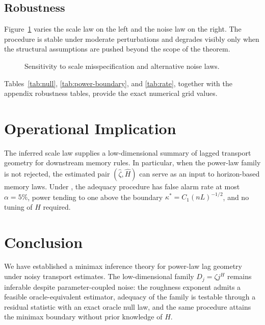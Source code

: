 \documentclass[10pt,a4paper,twocolumn]{article}
\begin{document}
\subsection{Robustness}

Figure~\ref{fig:robustness} varies the scale law on the left and the noise law
on the right.  The procedure is stable under moderate perturbations and
degrades visibly only when the structural assumptions are pushed beyond the
scope of the theorem.

\begin{figure}[t]
\centering
{}
\caption{Sensitivity to scale misspecification and alternative noise laws.}
\label{fig:robustness}
\end{figure}

Tables~\ref{tab:null}, \ref{tab:power-boundary}, and \ref{tab:rate}, together
with the appendix robustness tables,
provide the exact numerical grid values.

\section{Operational Implication}
\label{sec:application}

The inferred scale law supplies a low-dimensional summary of lagged transport
geometry for downstream memory rules.  In particular, when the power-law
family is not rejected, the estimated pair $(\widehat\zeta, \widehat H)$ can
serve as an input to horizon-based memory laws.  Under
, the adequacy procedure has false alarm
rate at most $\alpha = 5\%$, power tending to one above the boundary
$\kappa^* = C_1(nL)^{-1/2}$, and no tuning of $H$ required.

\section{Conclusion}
\label{sec:conclusion}

We have established a minimax inference theory for power-law lag geometry
under noisy transport estimates.  The low-dimensional family
$D_j = \zeta j^H$ remains inferable despite parameter-coupled noise: the
roughness exponent admits a feasible oracle-equivalent estimator, adequacy of
the family is testable through a residual statistic with an exact oracle null
law, and the same procedure attains the minimax boundary without prior
knowledge of $H$.
\end{document}
